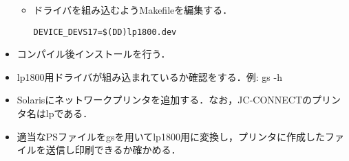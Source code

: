 \documentclass[a4j]{jarticle}
\begin{document}
\begin{itemize}
\begin{itemize}
\item ドライバを組み込むようMakefileを編集する．
\begin{center}
\begin{breakbox}
\begin{alltt}
DEVICE_DEVS17=\$(DD)lp1800.dev
\end{alltt}
\end{breakbox}
\end{center}
\end{itemize}
\item コンパイル後インストールを行う．
\item lp1800用ドライバが組み込まれているか確認をする．例: gs -h
\item Solarisにネットワークプリンタを追加する．なお，JC-CONNECTのプリンタ名はlpである．
\item 適当なPSファイルをgsを用いてlp1800用に変換し，プリンタに作成したファイルを送信し印刷できるか確かめる．
\end{itemize}
\end{document}
